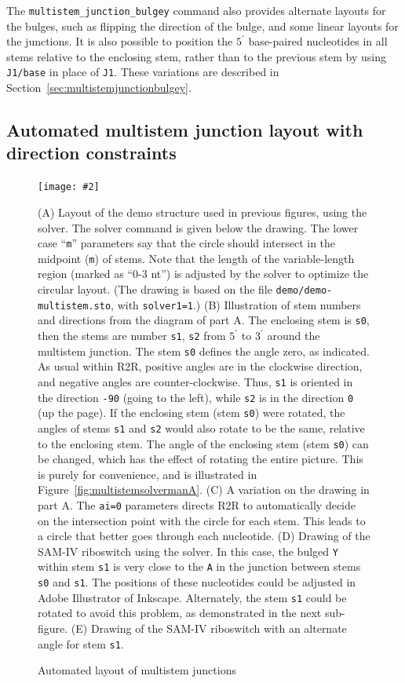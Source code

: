 \documentclass[letterpaper,12pt]{report}
\newcommand{\fig}[4]{
\begin{figure}
\texttt{[image: \#2]}
\caption{#3}

\begin{small}
#4
\end{small}
\label{#1}
\end{figure}
}
\begin{document}
The {\tt multistem\_junction\_bulgey} command also provides alternate layouts for the bulges, such as flipping the direction
of the bulge, and some linear layouts for the junctions.
It is also possible to position the $5^\prime$ base-paired nucleotides in all stems relative to the enclosing stem,
rather than to the previous stem by using {\tt J1/base} in place of {\tt J1}.
These variations are described in Section~\ref{sec:multistemjunctionbulgey}.

\subsection{Automated multistem junction layout with direction constraints}
\label{sec:automultistem}
\fig{fig:multistemsolver}{figures/multistem-solver.pdf}{Automated layout of multistem junctions}{
(A)
Layout of the demo structure used in previous figures, using the solver.
The solver command is given below the drawing.  
The lower case ``{\tt m}'' parameters say that the circle should intersect
in the midpoint ({\tt m}) of stems.
Note that the length of the variable-length region (marked as ``0-3 nt'') is adjusted by the solver
to optimize the circular layout.
(The drawing is based on the file {\tt demo/demo-multistem.sto}, with {\tt solver1=1}.)
(B)
Illustration of stem numbers and directions from the diagram of part A.
The enclosing stem is {\tt s0}, then the stems are number {\tt s1}, {\tt s2} from $5^\prime$ to $3^\prime$ around the multistem junction.
The stem {\tt s0} defines the angle zero, as indicated.  As usual within R2R, positive angles are in the clockwise direction, and negative angles are counter-clockwise.
Thus, {\tt s1} is oriented in the direction {\tt -90} (going to the left), while {\tt s2} is in the direction {\tt 0} (up the page).
If the enclosing stem (stem {\tt s0}) were rotated, the angles of stems {\tt s1} and {\tt s2} would also rotate to be the same,
relative to the enclosing stem.
The angle of the enclosing stem (stem {\tt s0}) can be changed, which has the effect of rotating the entire
picture.  This is purely for convenience, and is illustrated in Figure~\ref{fig:multistemsolvermanA}.
(C)
A variation on the drawing in part A.
The {\tt ai=0} parameters directs R2R to automatically decide on the intersection point with the circle for each
stem.  This leads to a circle that better goes through each nucleotide.
(D)
Drawing of the SAM-IV riboswitch \cite{SAMIV} using the solver.
In this case, the bulged {\tt Y} within stem {\tt s1} is very
close to the {\tt A} in the junction between stems {\tt s0} and {\tt s1}.
The positions of these nucleotides could be adjusted in Adobe Illustrator of Inkscape.
Alternately, the stem {\tt s1} could be rotated to avoid this problem,
as demonstrated in the next sub-figure.
(E)
Drawing of the SAM-IV riboswitch with an alternate angle for stem {\tt s1}.
}
\end{document}
